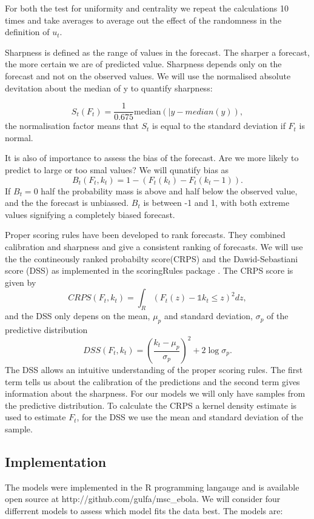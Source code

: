 \documentclass[12pt]{article}
\begin{document}
For both the test for uniformity and centrality we repeat the calculations 10 times and take averages to average out the effect of the randomness in the definition of $u_t$. 

Sharpness is defined as the range of values in the forecast. The sharper a forecast, the more certain we are of predicted value. Sharpness depends only on the forecast and not on the observed values. We will use the normalised absolute devitation about the median of y to quantify sharpness:

\[ S_t(F_t) = \frac{1}{0.675} \text{median}(|y - median(y)),\]
the normalisation factor means that $S_t$ is equal to the standard deviation if $F_t$ is normal.

It is also of importance to assess the bias of the forecast. Are we more likely to predict to large or too smal values? We will qunatify bias as
\[B_t(F_t, k_t) = 1 - (F_t(k_t) - F_t(k_t - 1)).\]
If $B_t=0$ half the probability mass is above and half below the observed value, and the the forecast is unbiassed. $B_t$ is between -1 and 1, with both extreme values signifying a completely biased forecast.

Proper scoring rules have been developed to rank forecasts. They combined calibration and sharpness and give a consistent ranking of forecasts. We will use the the contineously ranked probabilty score(CRPS) and the Dawid-Sebastiani score (DSS) as implemented in the scoringRules package \cite{jordanEvaluatingProbabilisticForecasts2018}. The CRPS score is given by 
\[CRPS(F_t,k_t) = \int_R(F_t(z) - \mathds{1}{k_t \leq z})^2 dz,\]
and the DSS only depens on the mean, $\mu_p$ and standard deviation, $\sigma_p$ of the predictive distribution
\[DSS(F_t, k_t) = \left(\frac{k_t- \mu_p}{\sigma_p}\right)^2 + 2\log\sigma_p.\]
The DSS allows an intuitive understanding of the proper scoring rules. The first term tells us about the calibration of the predictions and the second term gives information about the sharpness. For our models we will only have samples from the predictive distribution. To calculate the CRPS a kernel density estimate is used to estimate $F_t$, for the DSS we use the mean and standard deviation of the sample. 

\subsection{Implementation}
The models were implemented in the R programming langauge \cite{rcoreteamLanguageEnvironmentStatistical2018} and is available open source at http://github.com/gulfa/msc\_ebola. We will consider four differrent models to assess which model fits the data best. The models are:
\end{document}
